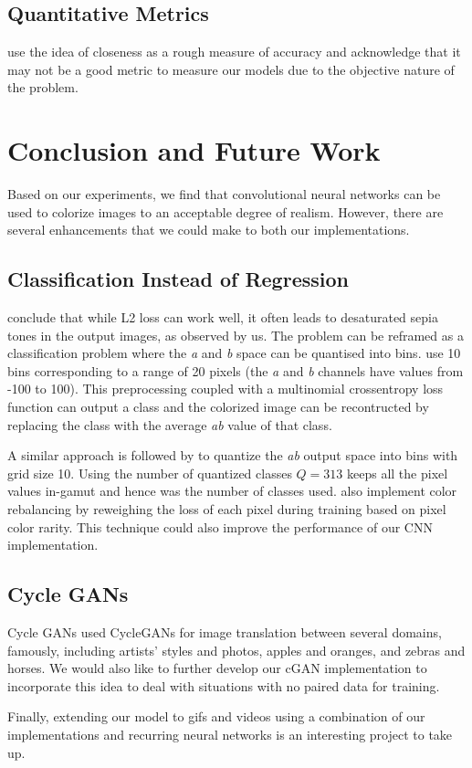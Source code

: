 \documentclass{article}
\begin{document}
\subsection{Quantitative Metrics}

\cite{agrawalexploring} use the idea of closeness as a rough measure of accuracy
and acknowledge that it may not be a good metric to measure our models due to the
objective nature of the problem.

\section{Conclusion and Future Work}

Based on our experiments, we find that convolutional neural networks can be used
to colorize images to an acceptable degree of realism. However, there are
several enhancements that we could make to both our implementations.

\subsection{Classification Instead of Regression}

\cite{Nazeri_2018} conclude that while L2 loss can work well, it often leads to
desaturated sepia tones in the output images, as observed by us. The problem can
be reframed as a classification problem where the \textit{a} and \textit{b}
space can be quantised into bins. \cite{Nazeri_2018} use 10 bins corresponding
to a range of 20 pixels (the \textit{a} and \textit{b} channels have values from
-100 to 100). This preprocessing coupled with a multinomial crossentropy loss
function can output a class and the colorized image can be recontructed by
replacing the class with the average \textit{ab} value of that class.

A similar approach is followed by \cite{DBLP:journals/corr/ZhangIE16} to
quantize the \textit{ab} output space into bins with grid size 10. Using the
number of quantized classes $Q = 313$ keeps all the pixel values in-gamut and
hence was the number of classes used. \cite{DBLP:journals/corr/ZhangIE16} also
implement color rebalancing by reweighing the loss of each pixel during
training based on pixel color rarity. This technique could also improve the
performance of our CNN implementation.

\subsection{Cycle GANs}

Cycle GANs \cite{DBLP:journals/corr/ZhuPIE17} used CycleGANs for image
translation between several domains, famously, including artists’ styles and
photos, apples and oranges, and zebras and horses. We would also like to further
develop our cGAN implementation to incorporate this idea to deal with situations
with no paired data for training.

Finally, extending our model to gifs and videos using a combination of our implementations
and recurring neural networks is an interesting project to take up.



\medskip
\end{document}

